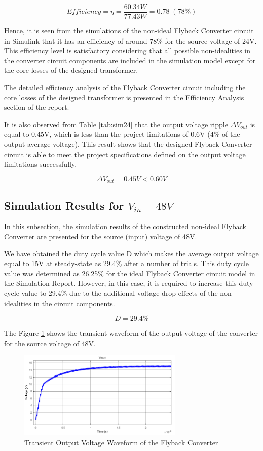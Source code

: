 $$ Efficiency = \eta = \frac{60.34W}{77.43W} = 0.78\;(78\%) $$

Hence, it is seen from the simulations of the non-ideal Flyback Converter circuit in Simulink that it has an efficiency of around 78\% for the source voltage of 24V. This efficiency level is satisfactory considering that all possible non-idealities in the converter circuit components are included in the simulation model except for the core losses of the designed transformer. 

The detailed efficiency analysis of the Flyback Converter circuit including the core losses of the designed transformer is presented in the Efficiency Analysis section of the report.

It is also observed from Table \ref{tab:sim24} that the output voltage ripple $\Delta V_{out}$ is equal to 0.45V, which is less than the project limitations of 0.6V (4\% of the output average voltage). This result shows that the designed Flyback Converter circuit is able to meet the project specifications defined on the output voltage limitations successfully.

$$ \Delta V_{out} = 0.45V < 0.60V $$

\subsection{Simulation Results for $V_{in} = 48V$}

In this subsection, the simulation results of the constructed non-ideal Flyback Converter are presented for the source (input) voltage of 48V.

We have obtained the duty cycle value D which makes the average output voltage equal to 15V at steady-state as 29.4\% after a number of trials. This duty cycle value was determined as 26.25\% for the ideal Flyback Converter circuit model in the Simulation Report. However, in this case, it is required to increase this duty cycle value to 29.4\% due to the additional voltage drop effects of the non-idealities in the circuit components.

$$ D = 29.4\% $$

The Figure \ref{fig:tran_out48} shows the transient waveform of the output voltage of the converter for the source voltage of 48V.

\begin{figure}[H]
\begin{center}
\includegraphics[width=0.7\textwidth]{figures/Vout_transient2_48.png}
\caption{Transient Output Voltage Waveform of the Flyback Converter}
\label{fig:tran_out48}
\end{center}
\end{figure}

